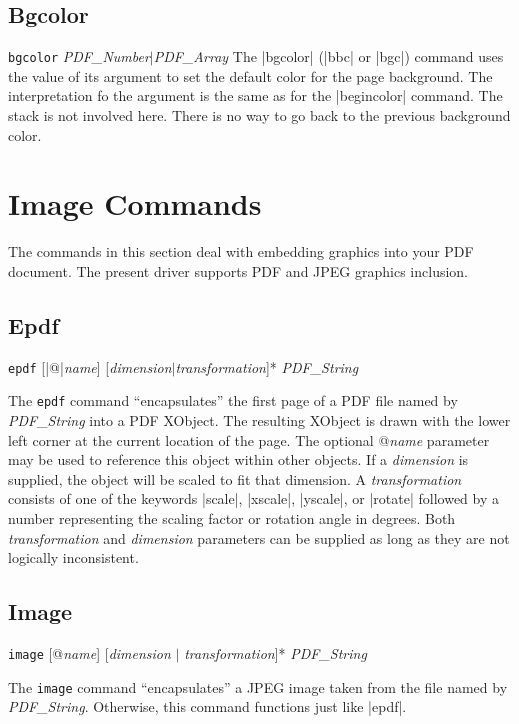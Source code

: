 {{\subsection{Bgcolor}
\syntax
{\tt bgcolor} {\it PDF\_Number$\vert$\it PDF\_Array}
\description
The |bgcolor| (|bbc| or |bgc|) command uses the value
of its argument to set the default color for the page
background.  The interpretation
fo the argument is the same as for the |begincolor| command.
The stack is not involved here.  There is no way
to go back to the previous background color.
\example
\begintt
{}
\endtt

\section{Image Commands}
The commands in this section deal with embedding
graphics into your PDF document.  The present
driver supports PDF and JPEG graphics inclusion.

\subsection{Epdf}
\syntax
{\tt epdf} [|@|{\it name}] [{\it dimension}$\vert${\it transformation}]*  {\it PDF\_String}

\description
The {\tt epdf} command ``encapsulates'' the first page of a PDF
file named by {\it PDF\_String}
into a PDF XObject.  The resulting XObject is drawn
with the lower left corner at the current location of the page.
The optional @{\it name} parameter may be used
to reference this object within other objects.  If a
{\it dimension} is supplied, the object will be scaled to fit
that dimension.  A {\it transformation} consists of one of the keywords
|scale|, |xscale|, |yscale|, or |rotate|
followed by a number representing
the scaling factor or rotation angle in degrees.  Both {\it transformation} and {\it dimension}
parameters can be supplied as long as they are not logically
inconsistent.
\example
\begintt
{}
\endtt

\subsection{Image}
\syntax
{\tt image} [@{\it name}] [{\it dimension} $\vert$ {\it transformation}]*  {\it PDF\_String}

\description
The {\tt image} command ``encapsulates'' a JPEG image
taken from the file named by {\it PDF\_String}.
Otherwise, this command functions just like |epdf|.

}}
